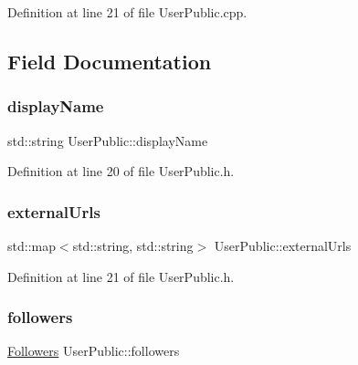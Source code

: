 Definition at line 21 of file User\+Public.\+cpp.



\subsection{Field Documentation}
\mbox{\label{class_user_public_a776a646494dd1aed6bc2cb4cc461f871}} 
\subsubsection{\texorpdfstring{display\+Name}{displayName}}
{\footnotesize\ttfamily std\+::string User\+Public\+::display\+Name\hspace{0.3cm}{\ttfamily [private]}}



Definition at line 20 of file User\+Public.\+h.

\mbox{\label{class_user_public_a90cba03790b8c1338a4440066783a5ce}} 
\subsubsection{\texorpdfstring{external\+Urls}{externalUrls}}
{\footnotesize\ttfamily std\+::map$<$std\+::string, std\+::string$>$ User\+Public\+::external\+Urls\hspace{0.3cm}{\ttfamily [private]}}



Definition at line 21 of file User\+Public.\+h.

\mbox{\label{class_user_public_a18186d35cce4138ab02bf56b01bd475d}} 
\subsubsection{\texorpdfstring{followers}{followers}}
{\footnotesize\ttfamily \mbox{\hyperlink{class_followers}{Followers}} User\+Public\+::followers\hspace{0.3cm}{\ttfamily [private]}}



